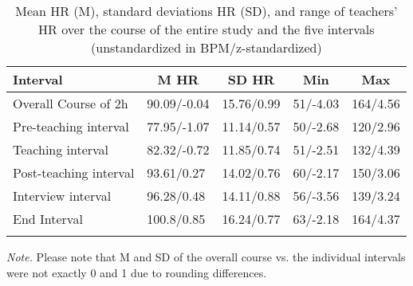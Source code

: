 


\begin{table}[h]

\begin{center}
\begin{threeparttable}

\caption{\label{tab:table_1}Mean HR (M), standard deviations HR (SD), and range of teachers’ HR over the course of the entire study and the five intervals (unstandardized in BPM/z-standardized)}

\begin{tabular}{lllll}
\toprule
Interval & \multicolumn{1}{c}{M HR} & \multicolumn{1}{c}{SD HR} & \multicolumn{1}{c}{Min} & \multicolumn{1}{c}{Max}\\
\midrule
Overall Course of 2h & 90.09/-0.04 & 15.76/0.99 & 51/-4.03 & 164/4.56\\
Pre-teaching interval & 77.95/-1.07 & 11.14/0.57 & 50/-2.68 & 120/2.96\\
Teaching interval & 82.32/-0.72 & 11.85/0.74 & 51/-2.51 & 132/4.39\\
Post-teaching interval & 93.61/0.27 & 14.02/0.76 & 60/-2.17 & 150/3.06\\
Interview interval & 96.28/0.48 & 14.11/0.88 & 56/-3.56 & 139/3.24\\
End Interval & 100.8/0.85 & 16.24/0.77 & 63/-2.18 & 164/4.37\\
\bottomrule
\addlinespace
\end{tabular}

\begin{tablenotes}[para]
\normalsize{\textit{Note.} Please note that M and SD of the overall course vs. the individual intervals were not exactly 0 and 1 due to rounding differences.}
\end{tablenotes}

\end{threeparttable}
\end{center}

\end{table}



